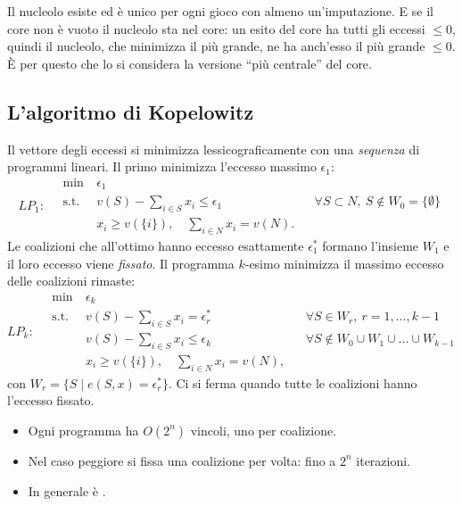 \begin{extra}
Il nucleolo esiste ed è unico per ogni gioco con almeno un'imputazione. E se il core non è
vuoto il nucleolo sta nel core: un esito del core ha tutti gli eccessi $\le 0$, quindi il
nucleolo, che minimizza il più grande, ne ha anch'esso il più grande $\le 0$. È per questo
che lo si considera la versione ``più centrale'' del core.
\end{extra}

\subsection{L'algoritmo di Kopelowitz}

Il vettore degli eccessi si minimizza lessicograficamente con una \emph{sequenza} di
programmi lineari. Il primo minimizza l'eccesso massimo $\epsilon_1$:
\[
LP_1:\quad
\begin{aligned}
  \min\ & \epsilon_1\\
  \text{s.t. }\ & v(S) - \textstyle\sum_{i \in S} x_i \le \epsilon_1
    && \forall S \subset N,\ S \notin W_0 = \{\emptyset\}\\
  & x_i \ge v(\{i\}),\quad \textstyle\sum_{i \in N} x_i = v(N).
\end{aligned}
\]
Le coalizioni che all'ottimo hanno eccesso esattamente $\epsilon_1^*$ formano l'insieme
$W_1$ e il loro eccesso viene \emph{fissato}. Il programma $k$-esimo minimizza il massimo
eccesso delle coalizioni rimaste:
\[
LP_k:\quad
\begin{aligned}
  \min\ & \epsilon_k\\
  \text{s.t. }\ & v(S) - \textstyle\sum_{i \in S} x_i = \epsilon_r^*
    && \forall S \in W_r,\ r = 1,\dots,k-1\\
  & v(S) - \textstyle\sum_{i \in S} x_i \le \epsilon_k
    && \forall S \notin W_0 \cup W_1 \cup \dots \cup W_{k-1}\\
  & x_i \ge v(\{i\}),\quad \textstyle\sum_{i \in N} x_i = v(N),
\end{aligned}
\]
con $W_r = \{S \mid e(S,x) = \epsilon_r^*\}$. Ci si ferma quando tutte le coalizioni hanno
l'eccesso fissato.

\begin{itemize}
  \item Ogni programma ha $O(2^n)$ vincoli, uno per coalizione.
  \item Nel caso peggiore si fissa una coalizione per volta: fino a $2^n$ iterazioni.
  \item In generale è .
\end{itemize}

